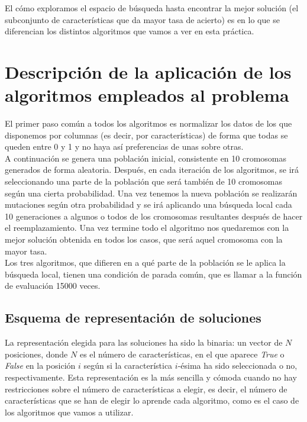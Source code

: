 \documentclass[12pt]{article}
\begin{document}
El cómo exploramos el espacio de búsqueda hasta encontrar la mejor solución (el subconjunto de características que da mayor tasa de acierto) es en lo que se diferencian los distintos algoritmos que vamos a ver en esta práctica.

\newpage

\section{Descripción de la aplicación de los algoritmos empleados al problema}
El primer paso común a todos los algoritmos es normalizar los datos de los que disponemos por columnas (es decir, por características) de forma que todas se queden entre 0 y 1 y no haya así preferencias de unas sobre otras.\\

A continuación se genera una población inicial, consistente en 10 cromosomas generados de forma aleatoria. Después, en cada iteración de los algoritmos, se irá seleccionando una parte de la población que será también de 10 cromosomas según una cierta probabilidad. Una vez tenemos la nueva población se realizarán mutaciones según otra probabilidad y se irá aplicando una búsqueda local cada 10 generaciones a algunos o todos de los cromosomas resultantes después de hacer el reemplazamiento. Una vez termine todo el algoritmo nos quedaremos con la mejor solución obtenida en todos los casos, que será aquel cromosoma con la mayor tasa.\\

Los tres algoritmos, que difieren en a qué parte de la población se le aplica la búsqueda local, tienen una condición de parada común, que es llamar a la función de evaluación 15000 veces.

\subsection{Esquema de representación de soluciones}
La representación elegida para las soluciones ha sido la binaria: un vector de $N$ posiciones, donde $N$ es el número de características, en el que aparece \textit{True} o \textit{False} en la posición $i$ según si la característica $i$-ésima ha sido seleccionada o no, respectivamente. Esta representación es la más sencilla y cómoda cuando no hay restricciones sobre el número de características a elegir, es decir, el número de características que se han de elegir lo aprende cada algoritmo, como es el caso de los algoritmos que vamos a utilizar.\\
\end{document}
